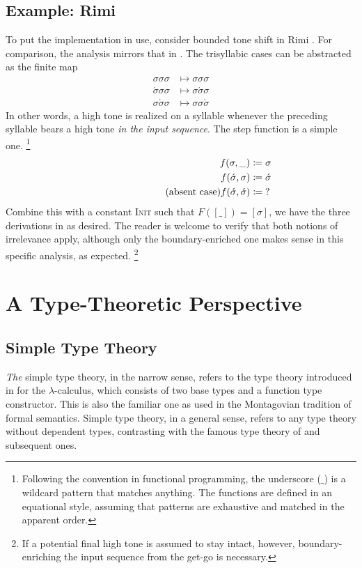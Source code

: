 \documentclass[11pt]{article}
\theoremstyle{definition}
\theoremstyle{plain}
\newcommand{\coloneq}{\mathrel{\vcentcolon\mkern-1.2mu=}}
\newcommand{\hole}{\_}
\newcommand{\note}[1]{\text{\phantom{(#1)}} \tag{#1}}
\begin{document}
\subsection{Example: Rimi}
\label{sec:rimi}
To put the implementation in use, consider bounded tone shift in Rimi
\citep{m97oeot}.  For comparison, the analysis mirrors that in
\citet{cj21iolr}.  The trisyllabic cases can be abstracted as the
finite map
%
\begin{align*}
  \sigma\sigma\sigma &\mapsto \sigma\sigma\sigma \\
  \acute{\sigma}\sigma\sigma &\mapsto \sigma\acute{\sigma}\sigma \\
  \sigma\acute{\sigma}\sigma &\mapsto \sigma\sigma\acute{\sigma}
\end{align*}
%
In other words, a high tone is realized on a syllable whenever the
preceding syllable bears a high tone \emph{in the input sequence}.
The step function is a simple one.%
\footnote{Following the convention in functional programming, the
  underscore (\(\hole\)) is a wildcard pattern that matches anything.
  The functions are defined in an equational style, assuming that
  patterns are exhaustive and matched in the apparent order.}
%
\begin{align*}
  f(\sigma, \hole) &\coloneq \sigma \\
  f(\acute{\sigma}, \sigma) &\coloneq \acute{\sigma} \\
  \note{absent case}
  f(\acute{\sigma}, \acute{\sigma}) &\coloneq {?}
\end{align*}
%
Combine this with a constant \textsc{Init} such that
\(F([\hole]) = [\sigma]\), we have the three derivations in
 as desired.  The reader is welcome to verify
that both notions of irrelevance apply, although only the
boundary-enriched one makes sense in this specific analysis, as
expected.%
\footnote{If a potential final high tone is assumed to stay intact,
  however, boundary-enriching the input sequence from the get-go is
  necessary.}

\section{A Type-Theoretic Perspective}
\subsection{Simple Type Theory}
\emph{The} simple type theory, in the narrow sense, refers to the type
theory introduced in \citet{c40fstt} for the \(\lambda\)-calculus,
which consists of two base types and a function type constructor.
This is also the familiar one as used in the Montagovian tradition of
formal semantics.  Simple type theory, in a general sense, refers to
any type theory without dependent types, contrasting with the famous
type theory of \citet{m75ittpp} and subsequent ones.
\end{document}
